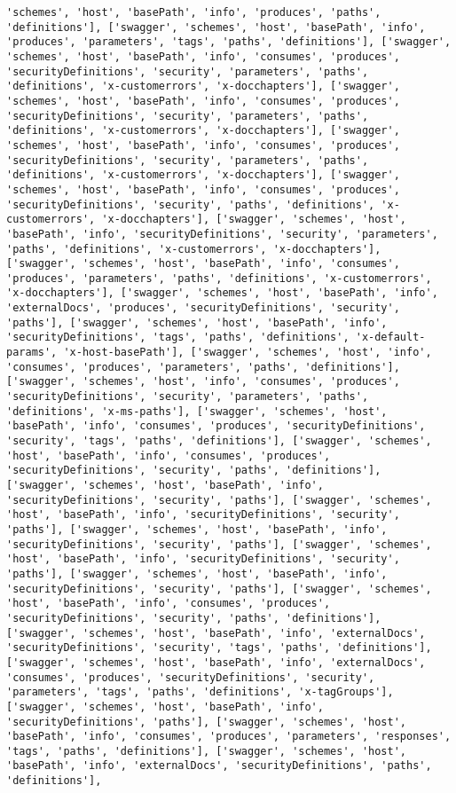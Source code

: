 \documentclass[11pt]{article}
\begin{document}
\begin{Verbatim}[commandchars=\\\{\}]
'schemes', 'host', 'basePath', 'info', 'produces', 'paths', 'definitions'], ['swagger', 'schemes', 'host', 'basePath', 'info', 'produces', 'parameters', 'tags', 'paths', 'definitions'], ['swagger', 'schemes', 'host', 'basePath', 'info', 'consumes', 'produces', 'securityDefinitions', 'security', 'parameters', 'paths', 'definitions', 'x-customerrors', 'x-docchapters'], ['swagger', 'schemes', 'host', 'basePath', 'info', 'consumes', 'produces', 'securityDefinitions', 'security', 'parameters', 'paths', 'definitions', 'x-customerrors', 'x-docchapters'], ['swagger', 'schemes', 'host', 'basePath', 'info', 'consumes', 'produces', 'securityDefinitions', 'security', 'parameters', 'paths', 'definitions', 'x-customerrors', 'x-docchapters'], ['swagger', 'schemes', 'host', 'basePath', 'info', 'consumes', 'produces', 'securityDefinitions', 'security', 'paths', 'definitions', 'x-customerrors', 'x-docchapters'], ['swagger', 'schemes', 'host', 'basePath', 'info', 'securityDefinitions', 'security', 'parameters', 'paths', 'definitions', 'x-customerrors', 'x-docchapters'], ['swagger', 'schemes', 'host', 'basePath', 'info', 'consumes', 'produces', 'parameters', 'paths', 'definitions', 'x-customerrors', 'x-docchapters'], ['swagger', 'schemes', 'host', 'basePath', 'info', 'externalDocs', 'produces', 'securityDefinitions', 'security', 'paths'], ['swagger', 'schemes', 'host', 'basePath', 'info', 'securityDefinitions', 'tags', 'paths', 'definitions', 'x-default-params', 'x-host-basePath'], ['swagger', 'schemes', 'host', 'info', 'consumes', 'produces', 'parameters', 'paths', 'definitions'], ['swagger', 'schemes', 'host', 'info', 'consumes', 'produces', 'securityDefinitions', 'security', 'parameters', 'paths', 'definitions', 'x-ms-paths'], ['swagger', 'schemes', 'host', 'basePath', 'info', 'consumes', 'produces', 'securityDefinitions', 'security', 'tags', 'paths', 'definitions'], ['swagger', 'schemes', 'host', 'basePath', 'info', 'consumes', 'produces', 'securityDefinitions', 'security', 'paths', 'definitions'], ['swagger', 'schemes', 'host', 'basePath', 'info', 'securityDefinitions', 'security', 'paths'], ['swagger', 'schemes', 'host', 'basePath', 'info', 'securityDefinitions', 'security', 'paths'], ['swagger', 'schemes', 'host', 'basePath', 'info', 'securityDefinitions', 'security', 'paths'], ['swagger', 'schemes', 'host', 'basePath', 'info', 'securityDefinitions', 'security', 'paths'], ['swagger', 'schemes', 'host', 'basePath', 'info', 'securityDefinitions', 'security', 'paths'], ['swagger', 'schemes', 'host', 'basePath', 'info', 'consumes', 'produces', 'securityDefinitions', 'security', 'paths', 'definitions'], ['swagger', 'schemes', 'host', 'basePath', 'info', 'externalDocs', 'securityDefinitions', 'security', 'tags', 'paths', 'definitions'], ['swagger', 'schemes', 'host', 'basePath', 'info', 'externalDocs', 'consumes', 'produces', 'securityDefinitions', 'security', 'parameters', 'tags', 'paths', 'definitions', 'x-tagGroups'], ['swagger', 'schemes', 'host', 'basePath', 'info', 'securityDefinitions', 'paths'], ['swagger', 'schemes', 'host', 'basePath', 'info', 'consumes', 'produces', 'parameters', 'responses', 'tags', 'paths', 'definitions'], ['swagger', 'schemes', 'host', 'basePath', 'info', 'externalDocs', 'securityDefinitions', 'paths', 'definitions'], 
\end{Verbatim}
\end{document}

